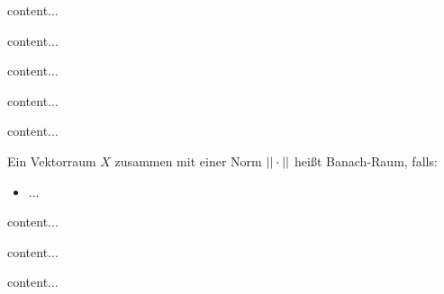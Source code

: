 \begin{definition}
	content...
\end{definition}

\begin{satz}
	content...
\end{satz}

\begin{definition}[Eigenfunktionen]
	content...
\end{definition}

\begin{definition}[Faltung]
	content...
\end{definition}

\begin{definition}
	content...
\end{definition}

\begin{definition}
	Ein Vektorraum $X$ zusammen mit einer Norm $||\cdot||$ heißt Banach-Raum, falls:
	\begin{itemize}
		\item ...
	\end{itemize}
\end{definition}


\begin{definition}
	content...
\end{definition}

\begin{definition}
	content...
\end{definition}

\begin{definition}
	content...
\end{definition}

\pagebreak


